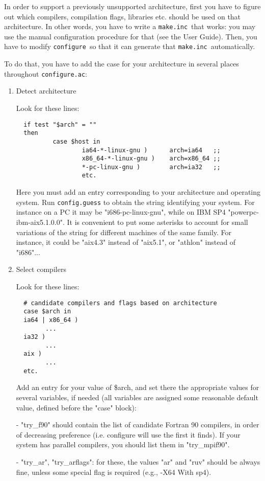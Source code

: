 \documentclass[12pt,a4paper]{article}
\def\configure{\texttt{configure}}
\def\configurac{\texttt{configure.ac}}
\def\make.inc{\texttt{make.inc}}
\begin{document}
In order to support a previously unsupported architecture, first you
have to figure out which compilers, compilation flags, libraries
etc. should be used on that architecture.
In other words, you have to write a \make.inc\ that works: you may use
the manual configuration procedure for that (see the
User Guide).  Then, you have to modify \configure\ so that it can
generate that \make.inc\ automatically.

To do that, you have to add the case for your architecture in several
places throughout \configurac:
\begin{enumerate}
\item Detect architecture

Look for these lines:
\begin{verbatim}
  if test "$arch" = ""
  then
          case $host in
                  ia64-*-linux-gnu )      arch=ia64   ;;
                  x86_64-*-linux-gnu )    arch=x86_64 ;;
                  *-pc-linux-gnu )        arch=ia32   ;;
                  etc.
\end{verbatim}
Here you must add an entry corresponding to your architecture and
operating system.  Run \texttt{config.guess} to obtain the string identifying
your system.
For instance on a PC it may be "i686-pc-linux-gnu", while on IBM SP4
"powerpc-ibm-aix5.1.0.0".  It is convenient to put some asterisks to
account for small variations of the string for different machines of
the same family.  For instance, it could be "aix4.3" instead of
"aix5.1", or "athlon" instead of "i686"...

\item  Select compilers

Look for these lines:

\begin{verbatim}
  # candidate compilers and flags based on architecture
  case $arch in
  ia64 | x86_64 )
        ...
  ia32 )
        ...
  aix )
        ...
  etc.
\end{verbatim}

Add an entry for your value of \$arch, and set there the appropriate
values for several variables, if needed (all variables are assigned
some reasonable default value, defined before the "case" block):

- "try\_f90" should contain the list of candidate Fortran 90 compilers,
in order of decreasing preference (i.e. configure will use the first
it finds).  If your system has parallel compilers, you should list
them in "try\_mpif90".

- "try\_ar", "try\_arflags": for these, the values "ar" and "ruv" should
be always fine, unless some special flag is required (e.g., -X64
With sp4).


\end{enumerate}
\end{document}
